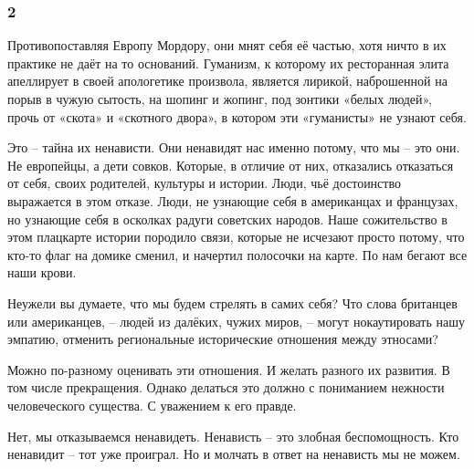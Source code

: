  
 
 
 
 

\subsubsection{2}
\label{sec:19_02_2022.fb.uljanov_anatolij.1.mne_nravitsja_kak_ih_korezhit.2}

Противопоставляя Европу Мордору, они мнят себя её частью, хотя ничто в их
практике не даёт на то оснований. Гуманизм, к которому их ресторанная элита
апеллирует в своей апологетике произвола, является лирикой, наброшенной на
порыв в чужую сытость, на шопинг и жопинг, под зонтики «белых людей», прочь от
«скота» и «скотного двора», в котором эти «гуманисты» не узнают себя.

Это – тайна их ненависти. Они ненавидят нас именно потому, что мы – это они. Не
европейцы, а дети совков. Которые, в отличие от них, отказались отказаться от
себя, своих родителей, культуры и истории. Люди, чьё достоинство выражается в
этом отказе. Люди, не узнающие себя в американцах и французах, но узнающие себя
в осколках радуги советских народов. Наше сожительство в этом плацкарте истории
породило связи, которые не исчезают просто потому, что кто-то флаг на домике
сменил, и начертил полосочки на карте. По нам бегают все наши крови.

Неужели вы думаете, что мы будем стрелять в самих себя? Что слова британцев
или американцев, – людей из далёких, чужих миров, – могут нокаутировать нашу
эмпатию, отменить региональные исторические отношения между этносами?

Можно по-разному оценивать эти отношения. И желать разного их развития. В том
числе прекращения. Однако делаться это должно с пониманием нежности
человеческого существа. С уважением к его правде.

Нет, мы отказываемся ненавидеть. Ненависть – это злобная беспомощность. Кто
ненавидит – тот уже проиграл. Но и молчать в ответ на ненависть мы не можем.
